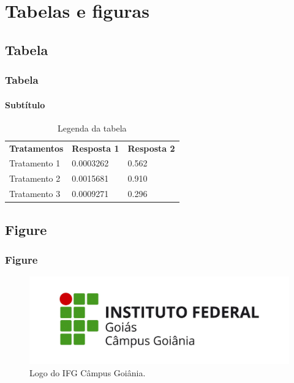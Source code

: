 
\section{Tabelas e figuras}

\subsection{Tabela}

\begin{frame}
	\frametitle{Tabela}
	\framesubtitle{Subtítulo} %
	
	\begin{table}
		\caption{Legenda da tabela}
		\begin{tabular}{l l l}
			\textbf{Tratamentos} & \textbf{Resposta 1} & \textbf{Resposta 2}\\
			Tratamento 1 & 0.0003262 & 0.562 \\
			Tratamento 2 & 0.0015681 & 0.910 \\
			Tratamento 3 & 0.0009271 & 0.296 
		\end{tabular}
	\end{table}
\end{frame}


\subsection{Figure}

\begin{frame}
	\frametitle{Figure}
	
	\begin{figure}
		\caption{Logo do IFG Câmpus Goiânia.}
		\includegraphics[width=0.6\linewidth]{./fig/logogoiania}
	\end{figure}
\end{frame}